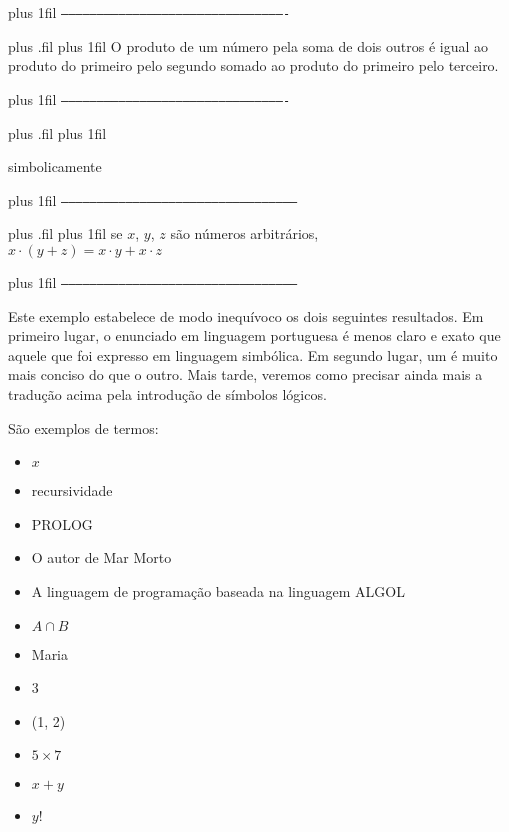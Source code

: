 \documentclass[
	12pt,				%
	twoside,			%
	a4paper,			%
	english,			%
	french,				%
	spanish,			%
	brazil,				%
	]{abntex2}
\begin{document}
\vskip 1cm

\begingroup
\leftskip=3cm \rightskip=3cm
\parfillskip=0.5cm plus 1fil
\noindent\texttt{----------------------------------------------------------------------------------------------}

\leftskip=3.3cm plus .fil \rightskip=3.3cm
\parfillskip=0.5cm plus 1fil
\noindent O produto de um número pela soma de dois outros é igual ao produto do primeiro pelo segundo somado ao produto do primeiro pelo terceiro.

\leftskip=3cm \rightskip=3cm
\parfillskip=0.5cm plus 1fil
\noindent\texttt{----------------------------------------------------------------------------------------------}\par

\leftskip=3.3cm plus .fil \rightskip=3.3cm
\parfillskip=0.5cm plus 1fil

\vskip 0.5cm
\centering simbolicamente
\vskip 0.5cm

\leftskip=3cm \rightskip=3cm
\parfillskip=0.5cm plus 1fil
\noindent\texttt{--------------------------------------------------------------------------------------------------}

\leftskip=3.6cm plus .fil \rightskip=3cm
\parfillskip=0.5cm plus 1fil
\noindent \centering se $x$, $y$, $z$ são números arbitrários,\\
$x \cdot (y + z) = x \cdot y + x \cdot z$

\leftskip=3cm \rightskip=3cm
\parfillskip=0.5cm plus 1fil
\noindent\texttt{--------------------------------------------------------------------------------------------------}\par

\endgroup
\newpage
Este exemplo estabelece de modo inequívoco os dois seguintes resultados. Em primeiro lugar, o enunciado em linguagem portuguesa é menos claro e exato que aquele que foi expresso em linguagem simbólica. Em segundo lugar, um é muito mais conciso do que o outro. Mais tarde, veremos como precisar ainda mais a tradução acima pela introdução de símbolos lógicos.

\newpage

\newpage

\noindent São exemplos de termos:

\begin{itemize}[itemsep=0.01pt]
\renewcommand\labelitemi{\textbf{-}}
    \item $x$
    \item recursividade
    \item PROLOG
    \item  O autor de Mar Morto
    \item  A linguagem de programação baseada na linguagem ALGOL
    \item $A \cap B$
    \item Maria
    \item 3
    \item (1, 2)
    \item $5 \times 7$
    \item $x + y$
    \item $y!$

\end{itemize}
\end{document}
